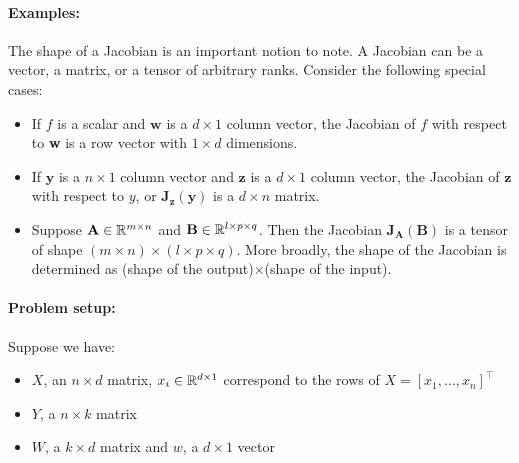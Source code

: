 \paragraph{Examples:}The shape of a Jacobian is an important notion to note. A Jacobian can be a vector, a matrix, or a tensor of arbitrary ranks. Consider the following special cases: 
\begin{itemize}
    \item If $f$ is a scalar and $\textbf{w}$ is a $d \times 1$ column vector, the Jacobian of $f$ with respect to \textbf{w} is a row vector with $1 \times d$ dimensions.
    \item If $\textbf{y}$ is a $n \times 1$ column vector and $\textbf{z}$ is a $d \times 1$ column vector, the Jacobian of $\mathbf{z}$ with respect to $y$, or $\textbf{J}_\textbf{z}(\textbf{y})$ is a $d \times n$ matrix.  
    \item Suppose $\textbf{A} \in \mathbb{R}^{m\times n}$ and  $\mathbf{B} \in \mathbb{R}^{l\times p \times q}$. Then  the Jacobian $\textbf{J}_\textbf{A}({\textbf{B}})$  is a tensor of shape $(m \times n) \times (l \times p \times q)$. 
    More broadly, the shape of the Jacobian is determined as (shape of the output)$\times$(shape of the input).
\end{itemize}



\noindent \paragraph{Problem setup:}Suppose we have:
\begin{itemize}
    \item $X$, an $n \times d$ matrix, $x_i \in \mathbb{R}^{d\times 1}$ correspond to the rows of $X = [x_1, \hdots, x_n]^\top$
    \item $Y$, a $n \times k$ matrix
    \item $W$, a $k \times d$ matrix and $w$, a $d \times 1$ vector
\end{itemize}

